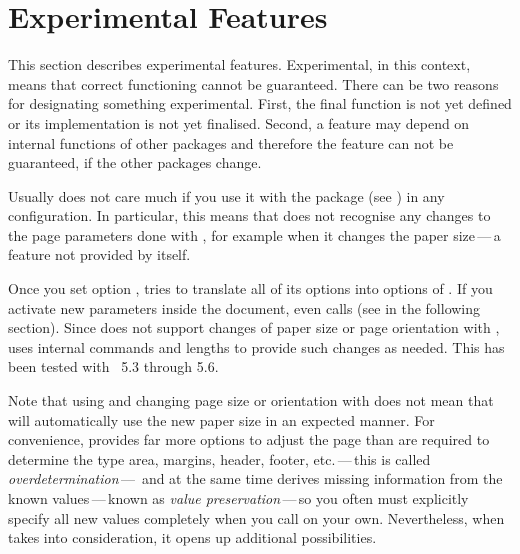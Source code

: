 \section{Experimental Features}

This section describes experimental features. Experimental, in this context,
means that correct functioning cannot be guaranteed. There can be two reasons
for designating something experimental. First, the final function is not yet
defined or its implementation is not yet finalised. Second, a feature may
depend on internal functions of other packages and therefore the feature can
not be guaranteed, if the other packages change.

\begin{Declaration}
\end{Declaration}
Usually  does not care much if you use it with the
 package (see
\cite{package:geometry}) in any configuration. In particular, this means that
 does not recognise any changes to the page parameters done
with , for example when it changes the paper size\,---\,a
feature not provided by  itself.

Once you set option ,
 tries to translate all of its options into options of
. If you activate new parameters inside the document,
 even calls  (see
 in the following section). Since
 does not support changes of paper size or page orientation
with ,  uses internal commands and
 lengths to provide such changes as needed. This has been
tested with ~5.3 through 5.6.

Note that using  and changing page size or orientation with
 does not mean that  will automatically
use the new paper size in an expected manner. For convenience,
 provides far more options to adjust the page than are
required to determine the type area, margins, header, footer, etc.\,---\,this
is called \emph{overdetermination}\,---\, and at the same time
 derives missing information from the known
values\,---\,known as \emph{value preservation}\,---\,so you often must
explicitly specify all new values completely when you call 
on your own. Nevertheless, when  takes 
into consideration, it opens up additional possibilities.%
\EndIndexGroup


